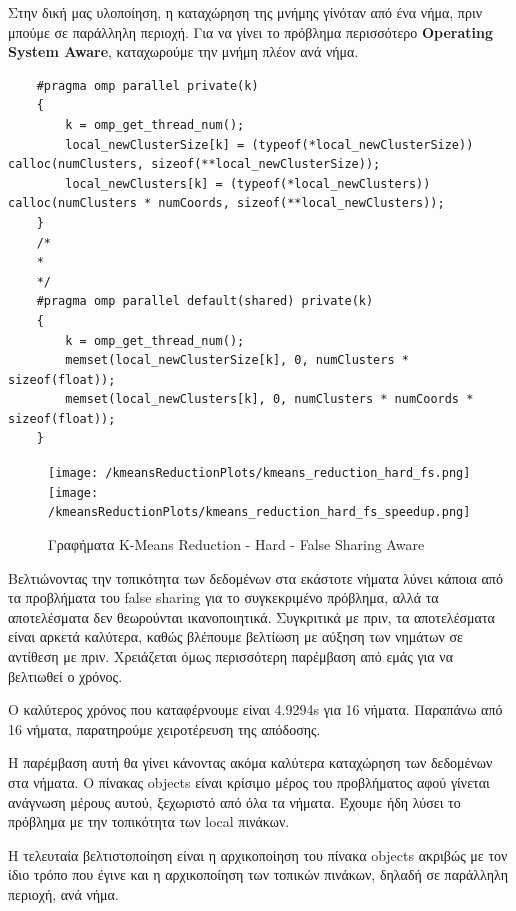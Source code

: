 \documentclass[letterpaper,12pt]{article}
\begin{document}
Στην δική μας υλοποίηση, η καταχώρηση της μνήμης γίνόταν από ένα νήμα, πριν μπούμε σε παράλληλη περιοχή. Για να γίνει το πρόβλημα
περισσότερο \textbf{Operating System Aware}, καταχωρούμε την μνήμη πλέον ανά νήμα.

\begin{lstlisting}
    #pragma omp parallel private(k)
    {
        k = omp_get_thread_num();
        local_newClusterSize[k] = (typeof(*local_newClusterSize)) calloc(numClusters, sizeof(**local_newClusterSize));
        local_newClusters[k] = (typeof(*local_newClusters)) calloc(numClusters * numCoords, sizeof(**local_newClusters));
    }
    /*
    *
    */
    #pragma omp parallel default(shared) private(k)
    {
        k = omp_get_thread_num();
        memset(local_newClusterSize[k], 0, numClusters * sizeof(float));
        memset(local_newClusters[k], 0, numClusters * numCoords * sizeof(float));
    }
\end{lstlisting}

\begin{figure}[H]
    \centering
    \texttt{[image: /kmeansReductionPlots/kmeans\_reduction\_hard\_fs.png]}
    \texttt{[image: /kmeansReductionPlots/kmeans\_reduction\_hard\_fs\_speedup.png]}
    \caption{Γραφήματα K-Means Reduction - Hard - False Sharing Aware}
    \label{fig:Γραφήματα K-Means Reduction - Hard - False Sharing Aware}
\end{figure}

Βελτιώνοντας την τοπικότητα των δεδομένων στα εκάστοτε νήματα λύνει κάποια από τα προβλήματα του false sharing για το 
συγκεκριμένο πρόβλημα, αλλά τα αποτελέσματα δεν θεωρούνται ικανοποιητικά. 
Συγκριτικά με πριν, τα αποτελέσματα είναι αρκετά καλύτερα, καθώς βλέπουμε βελτίωση με αύξηση των νημάτων σε αντίθεση με πριν.
Χρειάζεται όμως περισσότερη παρέμβαση από εμάς για να βελτιωθεί ο χρόνος.

Ο καλύτερος χρόνος που καταφέρνουμε είναι 4.9294s για 16 νήματα. Παραπάνω από 16 νήματα, παρατηρούμε χειροτέρευση
της απόδοσης.

Η παρέμβαση αυτή θα γίνει κάνοντας ακόμα καλύτερα καταχώρηση των δεδομένων στα νήματα. Ο πίνακας objects είναι κρίσιμο μέρος
του προβλήματος αφού γίνεται ανάγνωση μέρους αυτού, ξεχωριστό από όλα τα νήματα. Έχουμε ήδη λύσει το πρόβλημα με την τοπικότητα
των local πινάκων.

Η τελευταία βελτιστοποίηση είναι η αρχικοποίηση του πίνακα objects ακριβώς με τον ίδιο τρόπο που έγινε και η αρχικοποίηση των
τοπικών πινάκων, δηλαδή σε παράλληλη περιοχή, ανά νήμα.
\end{document}
